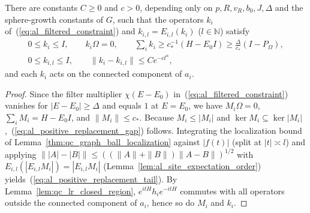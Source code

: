 \begin{theorem}
    \label{thm:al_positive_replacement}
    \leanok
    There are constants $C\ge0$ and $c>0$, depending only on
    $p,R,v_R,b_0,J,\Delta$ and the sphere-growth constants of $G$, such that the
    operators $k_i$ of~(\ref{eq:al_filtered_constraint}) and
    $k_{i,l}=E_{i,l}(k_i)$ ($l\in\mathbb N$) satisfy
    \begin{align}
        0\le k_i\le I,\qquad k_i\Omega=0,\qquad
        \sum_ik_i\ge c_*^{-1}(H-E_0I)\ge\frac{\Delta}{c_*}(I-P_\Omega),
        \label{eq:al_positive_replacement_gap} \\
        0\le k_{i,l}\le I,\qquad
        \|k_i-k_{i,l}\|\le Ce^{-cl^\alpha},
        \label{eq:al_positive_replacement_tail}
    \end{align}
    and each $k_i$ acts on the connected component of $a_i$.
\end{theorem}
\begin{proof}\leanok
    Since the filter multiplier $\chi(E-E_0)$ in~(\ref{eq:al_filtered_constraint})
    vanishes for $|E-E_0|\ge\Delta$ and equals $1$ at $E=E_0$, we have
    $M_i\Omega=0$, $\sum_iM_i=H-E_0I$, and $\|M_i\|\le c_*$. Because
    $M_i\le|M_i|$ and $\ker M_i\subseteq\ker|M_i|$,~(\ref{eq:al_positive_replacement_gap})
    follows. Integrating the localization bound of
    Lemma~\ref{thm:qc_graph_ball_localization} against $|f(t)|$ (split at
    $|t|\asymp l$) and applying
    $\||A|-|B|\|\le((\|A\|+\|B\|)\|A-B\|)^{1/2}$ with
    $E_{i,l}(|E_{i,l}M_i|)=|E_{i,l}M_i|$ (Lemma~\ref{lem:al_site_expectation_order})
    yields~(\ref{eq:al_positive_replacement_tail}). By
    Lemma~\ref{lem:qc_lr_closed_region}, $e^{itH}h_ie^{-itH}$ commutes with all
    operators outside the connected component of $a_i$, hence so do $M_i$ and
    $k_i$.
\end{proof}

